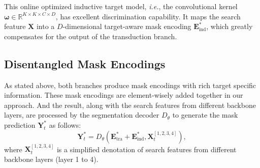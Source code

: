\documentclass[10pt,twocolumn,letterpaper]{article}
\begin{document}
This online optimized inductive target model, \textit{i.e.}, the convolutional kernel $\boldsymbol{\omega} \in \mathbb{R}^{K \times K \times C \times D}$, has excellent discrimination capability. It maps the search feature $\mathbf{X}$ into a $D$-dimensional target-aware mask encoding $\mathbf{E}_{\text{ind}}^*$, which greatly compensates for the output of the transduction branch.


\subsection{Disentangled Mask Encodings}\label{subsection:ldl}
As stated above, both branches produce mask encodings with rich target specific information. These mask encodings are element-wisely added together in our approach. And the result, along with the search features from different backbone layers, are processed by the segmentation decoder $D_{\theta}$ to generate the mask prediction $\mathbf{Y}_{t}^*$ as follows:
\begin{equation}
	\mathbf{Y}_{t}^* = D_{\theta}\left(\mathbf{E}_{\text{tra}}^{*} + \mathbf{E}_{\text{ind}}^{*}, \mathbf{X}_t^{[1,2,3,4]}\right),
\end{equation}
where $\mathbf{X}_t^{[1,2,3,4]}$ is a simplified denotation of search features from different backbone layers (layer 1 to 4).
\end{document}
